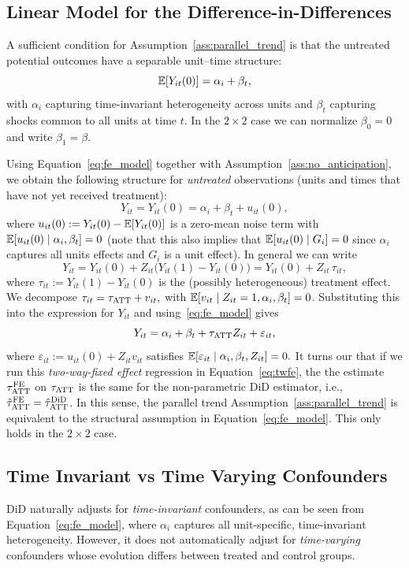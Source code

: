 \documentclass[11pt]{exam}
\begin{document}
\subsection{Linear Model for the Difference-in-Differences}
A sufficient condition for Assumption~\ref{ass:parallel_trend} is that
the untreated potential outcomes have a separable unit--time structure:
\begin{equation}\label{eq:fe_model}
    \mathbb{E}[Y_{it}(0)] = \alpha_i + \beta_t,
\end{equation}
with $\alpha_i$ capturing time-invariant heterogeneity across units and
$\beta_t$ capturing shocks common to all units at time $t$. In the $2 \times 2$
case we can normalize $\beta_0 = 0$ and write $\beta_1 = \beta$.

Using Equation~\eqref{eq:fe_model} together with Assumption~\ref{ass:no_anticipation},
we obtain the following structure for \emph{untreated} observations (units and times
that have not yet received treatment):
\[
    Y_{it} = Y_{it}(0) = \alpha_i + \beta_t + u_{it}(0),
\]
where $u_{it}(0) := Y_{it}(0) - \mathbb{E}[Y_{it}(0)]$ is a zero-mean noise term with
$\mathbb{E}[u_{it}(0) \mid \alpha_i, \beta_t] = 0$ (note that this also implies that $\mathbb{E}[u_{it}(0) \mid G_i] = 0$ since $\alpha_i$ captures all units effects and $G_i$ is a unit effect).
In general we can write
\[
    Y_{it} = Y_{it}(0) + Z_{it}\bigl(Y_{it}(1) - Y_{it}(0)\bigr)
           = Y_{it}(0) + Z_{it}\,\tau_{it},
\]
where $\tau_{it} := Y_{it}(1) - Y_{it}(0)$ is the (possibly heterogeneous)
treatment effect. We decompose $\tau_{it} = \tau_{\mathrm{ATT}} + v_{it},$
with $\mathbb{E}[v_{it} \mid Z_{it}=1,\alpha_i,\beta_t] = 0$. Substituting this into
the expression for $Y_{it}$ and using~\eqref{eq:fe_model} gives
\begin{equation}\label{eq:twfe}
    Y_{it} = \alpha_i + \beta_t + \tau_{\mathrm{ATT}} Z_{it} + \varepsilon_{it},
\end{equation}
where
$\varepsilon_{it} := u_{it}(0) + Z_{it} v_{it}$ satisfies $\mathbb{E}[\varepsilon_{it} \mid \alpha_i, \beta_t, Z_{it}] = 0.$
It turns our that if we run this \emph{two-way-fixed effect} regression in Equation~\ref{eq:twfe}, the the estimate $\tau^{\mathrm{FE}}_{\mathrm{ATT}}$ on $\tau_{\mathrm{ATT}}$ is the same for the non-parametric DiD estimator, i.e., $ \hat \tau^{\mathrm{FE}}_{\mathrm{ATT}} =  \hat \tau^{\mathrm{DiD}}_{\mathrm{ATT}}$. In this sense, the parallel trend Assumption~\ref{ass:parallel_trend} is equivalent to the structural assumption in Equation~\ref{eq:fe_model}. This only holds in the $2 \times 2$ case.

\subsection{Time Invariant vs Time Varying Confounders}
DiD naturally adjusts for \emph{time-invariant} confounders, as can be seen from
Equation~\eqref{eq:fe_model}, where $\alpha_i$ captures all unit-specific,
time-invariant heterogeneity. However, it does not automatically adjust for
\emph{time-varying} confounders whose evolution differs between treated and
control groups.
\end{document}
